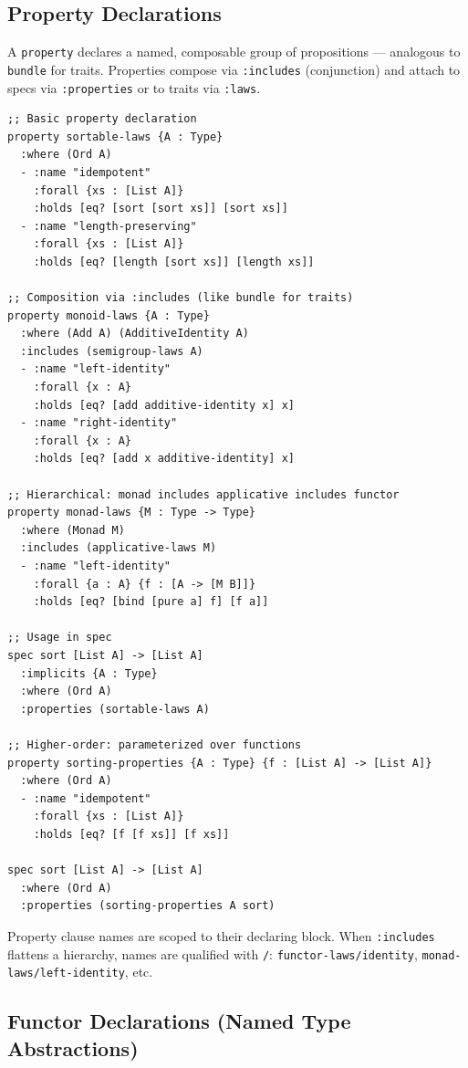 \documentclass[11pt]{article}
\begin{document}
\subsection{Property Declarations}
\label{sec:org61c8206}

A \texttt{property} declares a named, composable group of propositions --- analogous
to \texttt{bundle} for traits. Properties compose via \texttt{:includes} (conjunction) and
attach to specs via \texttt{:properties} or to traits via \texttt{:laws}.

\begin{verbatim}
;; Basic property declaration
property sortable-laws {A : Type}
  :where (Ord A)
  - :name "idempotent"
    :forall {xs : [List A]}
    :holds [eq? [sort [sort xs]] [sort xs]]
  - :name "length-preserving"
    :forall {xs : [List A]}
    :holds [eq? [length [sort xs]] [length xs]]

;; Composition via :includes (like bundle for traits)
property monoid-laws {A : Type}
  :where (Add A) (AdditiveIdentity A)
  :includes (semigroup-laws A)
  - :name "left-identity"
    :forall {x : A}
    :holds [eq? [add additive-identity x] x]
  - :name "right-identity"
    :forall {x : A}
    :holds [eq? [add x additive-identity] x]

;; Hierarchical: monad includes applicative includes functor
property monad-laws {M : Type -> Type}
  :where (Monad M)
  :includes (applicative-laws M)
  - :name "left-identity"
    :forall {a : A} {f : [A -> [M B]]}
    :holds [eq? [bind [pure a] f] [f a]]

;; Usage in spec
spec sort [List A] -> [List A]
  :implicits {A : Type}
  :where (Ord A)
  :properties (sortable-laws A)

;; Higher-order: parameterized over functions
property sorting-properties {A : Type} {f : [List A] -> [List A]}
  :where (Ord A)
  - :name "idempotent"
    :forall {xs : [List A]}
    :holds [eq? [f [f xs]] [f xs]]

spec sort [List A] -> [List A]
  :where (Ord A)
  :properties (sorting-properties A sort)
\end{verbatim}

Property clause names are scoped to their declaring block. When \texttt{:includes}
flattens a hierarchy, names are qualified with \texttt{/}:
\texttt{functor-laws/identity}, \texttt{monad-laws/left-identity}, etc.
\subsection{Functor Declarations (Named Type Abstractions)}
\label{sec:org2c36132}
\end{document}
